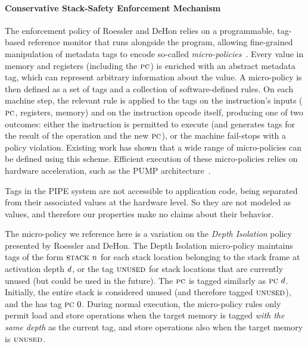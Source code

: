 \documentclass[10pt,conference]{ieeetran}%
\theoremstyle{definition}
\begin{document}
{\paragraph*{Conservative Stack-Safety Enforcement Mechanism}
%
The enforcement policy of Roessler and DeHon \cite{DBLP:conf/sp/RoesslerD18} relies
on a programmable, tag-based reference monitor that runs alongside the
program,
allowing fine-grained manipulation of metadata tags to encode so-called
\emph{micro-policies}~\cite{pump_oakland2015}.
Every value in
memory and registers (including the $\textsc{pc}$)
is enriched with an abstract metadata tag, which can represent
arbitrary information about the value. A micro-policy is then defined as a
set of tags and a
collection of software-defined rules.
On each machine step, the relevant rule is applied to the tags on
the instruction's inputs ($\textsc{pc}$, registers, memory) and on the
\ifspace instruction \fi opcode \ifspace itself\fi, producing
one of two outcomes: either the instruction is permitted to execute (and
generates tags for the result of the operation and the new $\textsc{pc}$), or
the machine fail-stops with a policy violation.
Existing work \cite{TestingNI:ICFP,pump_oakland2015, DBLP:conf/sp/RoesslerD18}
has shown that a wide range of
micro-policies can be defined using this scheme.
Efficient execution of these micro-policies relies on hardware acceleration,
such as the PUMP architecture~\cite{pump:asplos2015}.

Tags in the PIPE system are not accessible to application code, being separated
from their associated values at the hardware level. So they are not modeled
as values, and therefore our properties make no claims about
their behavior.

The micro-policy we reference here is a variation
on the {\em Depth Isolation} policy presented by
Roessler and DeHon\cite{DBLP:conf/sp/RoesslerD18}.
The Depth Isolation micro-policy maintains tags of the form $\textsc{stack} ~ n$ for
each stack location belonging to the stack frame at activation depth
$d$, or the tag $\textsc{unused}$ for stack locations that are currently
unused (but could be used in the future).
%
The $\textsc{pc}$ is tagged similarly as $\textsc{pc} ~ d$.
%
Initially, the entire stack is considered unused (and therefore tagged
$\textsc{unused}$), and the {\PCname} has tag $\textsc{pc} ~ 0$.
%
During normal execution, the micro-policy rules only permit load and
store operations when the target memory is tagged {\em with the same
 depth} as the current {\PCname} tag, and store operations also when the
target memory is $\textsc{unused}$.

}
\end{document}
